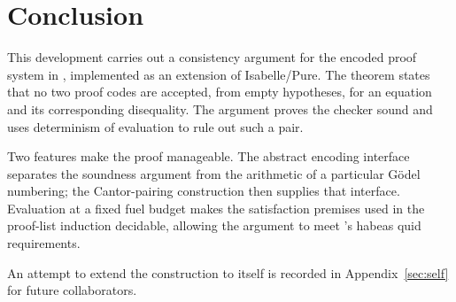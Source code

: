 \section{Conclusion}
\label{sec:conclusion}

This development carries out a consistency argument for the encoded \BGA{}
proof system in \QGA{}, implemented as an extension of Isabelle/Pure.
The theorem  states that no two proof
codes are accepted, from empty hypotheses, for an equation and its
corresponding disequality.  The argument proves the checker sound and uses
determinism of evaluation to rule out such a pair.

Two features make the proof manageable.  The abstract encoding interface
separates the soundness argument from the arithmetic of a particular
G\"odel numbering; the Cantor-pairing construction then supplies that
interface.  Evaluation at a fixed fuel budget makes the satisfaction
premises used in the proof-list induction decidable, allowing the argument
to meet \QGA's habeas quid requirements.

An attempt to
extend the construction to \QGA{} itself is recorded in
Appendix~\ref{sec:self} for future collaborators.
